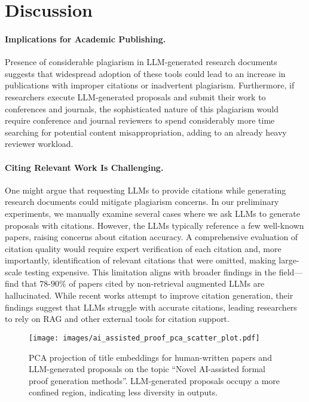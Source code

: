 \section{Discussion}
\label{sec:discussion}

\paragraph{Implications for Academic Publishing.} 
Presence of 
considerable plagiarism 
in LLM-generated 
research documents suggests 
that widespread adoption of these 
tools could lead to an increase in 
publications 
with improper citations or inadvertent plagiarism. 
Furthermore, 
if researchers execute LLM-generated proposals 
and submit their work to conferences and journals, 
the sophisticated nature of this plagiarism 
would require conference and journal reviewers 
to spend considerably more time searching for potential content misappropriation, 
adding to an already heavy reviewer workload.

\paragraph{Citing Relevant Work Is Challenging.} 
One might argue that 
requesting LLMs 
to provide citations while generating research documents could mitigate plagiarism concerns. 
In our preliminary experiments, 
we manually examine several cases 
where we ask LLMs to generate proposals with citations. 
However, 
the LLMs typically reference a few well-known papers, 
raising concerns about citation accuracy. 
A comprehensive evaluation of 
citation quality 
would require expert verification of each citation and, 
more importantly, 
identification of relevant citations that were omitted, 
making large-scale testing expensive. 
This limitation aligns with broader findings in the field---\citet{asai2024openscholar} 
find that $78$-$90\%$ of papers cited by non-retrieval augmented LLMs are hallucinated. 
While recent works \citep{asai2024openscholar, Gao2023EnablingLL, Qian2024OnTC} attempt to improve citation generation, 
their findings suggest that LLMs struggle with accurate citations, 
leading researchers to rely on RAG 
and other external tools for citation support.

\begin{figure}
    \centering
    \texttt{[image: images/ai\_assisted\_proof\_pca\_scatter\_plot.pdf]}
    \caption{PCA projection of title embeddings for human-written papers and LLM-generated proposals on the topic ``Novel AI-assisted formal proof generation methods''. LLM-generated proposals occupy a more confined region, indicating less diversity in outputs.}
    \label{fig:scatter}
\end{figure}


